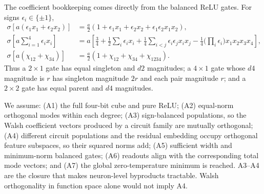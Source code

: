 \documentclass[10pt]{article}
\begin{document}
The coefficient bookkeeping comes directly from the balanced ReLU gates.  For signs
$\epsilon_i\in\{\pm1\}$,
\begin{align}
\sigma\!\left[a(\epsilon_1x_1+\epsilon_2x_2)\right]
&=\frac a2(1+\epsilon_1x_1+\epsilon_2x_2+\epsilon_1\epsilon_2x_1x_2),
\label{eq:d2-relu}\\
\sigma\!\left[a\sum_{i=1}^4\epsilon_ix_i\right]
&=a\!\left[\frac34+\frac12\sum_i\epsilon_ix_i
+\frac14\sum_{i<j}\epsilon_i\epsilon_jx_ix_j
-\frac14\Big(\prod_i\epsilon_i\Big)x_1x_2x_3x_4\right],
\label{eq:d4-relu}\\
\sigma[a(\chi_{12}+\chi_{34})]
&=\frac a2(1+\chi_{12}+\chi_{34}+\chi_{1234}).
\label{eq:compose-relu}
\end{align}
Thus a $2\times1$ gate has equal singleton and $d2$ magnitudes; a $4\times1$ gate whose
$d4$ magnitude is $r$ has singleton magnitude $2r$ and each pair magnitude $r$; and a
$2\times2$ gate has equal parent and $d4$ magnitudes.

We assume: (A1) the full four-bit cube and pure ReLU; (A2) equal-norm orthogonal modes within
each degree; (A3) sign-balanced populations, so the Walsh coefficient vectors produced by a
circuit family are mutually orthogonal; (A4) different circuit populations and the residual
embedding occupy orthogonal feature subspaces, so their squared norms add; (A5) sufficient
width and minimum-norm balanced gates; (A6) readouts align with the corresponding total mode
vectors; and (A7) the global zero-temperature minimum is reached.  A3--A4 are the closure that
makes neuron-level byproducts tractable.  Walsh orthogonality in function space alone would
not imply A4.
\end{document}
